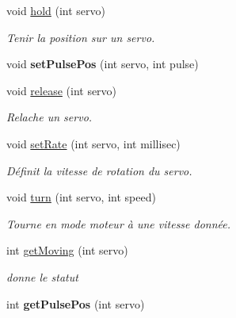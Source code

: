 \begin{DoxyCompactItemize}
void \hyperlink{classServoDriver_af580283b3d1765c9a27276e9a870cf88}{hold} (int servo)
\begin{DoxyCompactList}\small\item\em Tenir la position sur un servo. \end{DoxyCompactList}\item 
\mbox{\label{classServoDriver_a3fe921840162c052c3be72b5d0a95ce4}} 
void {\bfseries set\+Pulse\+Pos} (int servo, int pulse)
\item 
\mbox{\label{classServoDriver_aa1040b0db7ed851aec70a122301fe665}} 
void \hyperlink{classServoDriver_aa1040b0db7ed851aec70a122301fe665}{release} (int servo)
\begin{DoxyCompactList}\small\item\em Relache un servo. \end{DoxyCompactList}\item 
\mbox{\label{classServoDriver_a27d45f075f5fb2333937ab253a8cce6c}} 
void \hyperlink{classServoDriver_a27d45f075f5fb2333937ab253a8cce6c}{set\+Rate} (int servo, int millisec)
\begin{DoxyCompactList}\small\item\em Définit la vitesse de rotation du servo. \end{DoxyCompactList}\item 
\mbox{\label{classServoDriver_ad68ebde8a710451c8fea2cd03cfa4bc0}} 
void \hyperlink{classServoDriver_ad68ebde8a710451c8fea2cd03cfa4bc0}{turn} (int servo, int speed)
\begin{DoxyCompactList}\small\item\em Tourne en mode moteur à une vitesse donnée. \end{DoxyCompactList}\item 
int \hyperlink{classServoDriver_a0a8e84f0bbcff39549ddfc239f1a6237}{get\+Moving} (int servo)
\begin{DoxyCompactList}\small\item\em donne le statut \end{DoxyCompactList}\item 
\mbox{\label{classServoDriver_a716d64d7b2203c9cb8dff5c90d0a5dd9}} 
int {\bfseries get\+Pulse\+Pos} (int servo)
\item 
\mbox{\label{classServoDriver_a952fbbfdbf9d0b57d5c6d6c09019b366}} 

\end{DoxyCompactItemize}
